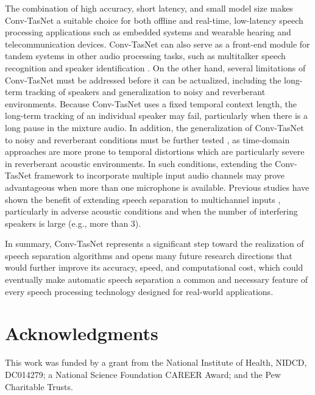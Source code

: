 \documentclass[journal]{IEEEtran}
\begin{document}
The combination of high accuracy, short latency, and small model size makes Conv-TasNet a suitable choice for both offline and real-time, low-latency speech processing applications such as embedded systems and wearable hearing and telecommunication devices. Conv-TasNet can also serve as a front-end module for tandem systems in other audio processing tasks, such as multitalker speech recognition \cite{hershey2010super, weng2015deep, qian2017single, ochi2016multi} and speaker identification \cite{lei2014novel, mclaren2015advances}. On the other hand, several limitations of Conv-TasNet must be addressed before it can be actualized, including the long-term tracking of speakers and generalization to noisy and reverberant environments. Because Conv-TasNet uses a fixed temporal context length, the long-term tracking of an individual speaker may fail, particularly when there is a long pause in the mixture audio. In addition, the generalization of Conv-TasNet to noisy and reverberant conditions must be further tested \cite{luo2018real}, as time-domain approaches are more prone to temporal distortions which are particularly severe in reverberant acoustic environments. In such conditions, extending the Conv-TasNet framework to incorporate multiple input audio channels may prove advantageous when more than one microphone is available. Previous studies have shown the benefit of extending speech separation to multichannel inputs \cite{gannot2017consolidated, chen2017cracking, wang2018multi}, particularly in adverse acoustic conditions and when the number of interfering speakers is large (e.g., more than 3). 

In summary, Conv-TasNet represents a significant step toward the realization of speech separation algorithms and opens many future research directions that would further improve its accuracy, speed, and computational cost, which could eventually make automatic speech separation a common and necessary feature of every speech processing technology designed for real-world applications.
 
\iftrue
\section{Acknowledgments}
This work was funded by a grant from the National Institute of Health, NIDCD, DC014279; a National Science Foundation CAREER Award; and the Pew Charitable Trusts.
\fi
\vfill\pagebreak


\end{document}
